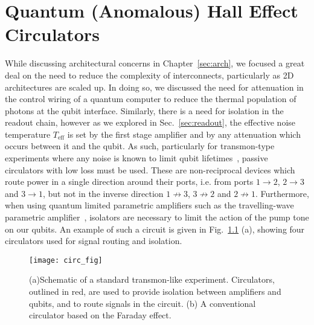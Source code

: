 \chapter{Quantum (Anomalous) Hall Effect Circulators}
\label{sec:hall}

While discussing architectural concerns in Chapter~\ref{sec:arch}, we focused a great deal on the need to reduce the complexity of interconnects,
particularly as 2D architectures are scaled up. In doing so, we discussed the need for attenuation in the control wiring of a quantum computer
to reduce the thermal population of photons at the qubit interface. Similarly, there is a need for isolation in the readout chain, however
as we explored in Sec.~\ref{sec:readout}, the effective noise temperature $T_\textrm{eff}$ is set by the first stage amplifier and by any attenuation
which occurs between it and the qubit. As such, particularly for transmon-type experiments where any noise is known to limit qubit
lifetimes~\cite{PhysRevLett.101.080502}, passive circulators with low loss must be used. These are non-reciprocal devices which route power
in a single direction around their ports, i.e. from ports $1 \to 2$, $2 \to 3$ and $3 \to 1$, but not in the inverse direction $1 \not\to 3$, $3 \not\to 2$
and $2 \not\to 1$. Furthermore, when using quantum limited parametric amplifiers such as the travelling-wave parametric amplifier~\cite{PhysRevLett.113.157001},
isolators are necessary to limit the action of the pump tone on our qubits. An example of such a circuit is given in Fig.~\ref{fig:circfig} (a), showing
four circulators used for signal routing and isolation.

\begin{figure}[tb]
    \texttt{[image: circ\_fig]}
    \caption[Schematic of a standard transmon-like experiment]
    {\label{fig:circfig}(a)Schematic of a standard transmon-like experiment. Circulators, outlined in red, are used to provide isolation between amplifiers and qubits,
    and to route signals in the circuit. (b) A conventional circulator based on the Faraday effect.}
\end{figure}

